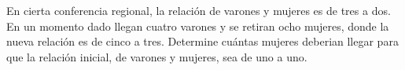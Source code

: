 \noindent
En cierta conferencia regional, la relación de varones y mujeres es de tres a dos. En un momento dado llegan cuatro varones y se retiran ocho mujeres, donde la nueva relación es de cinco a tres. Determine cuántas mujeres deberian llegar para que la relación inicial, de varones y mujeres, sea de uno a uno.
